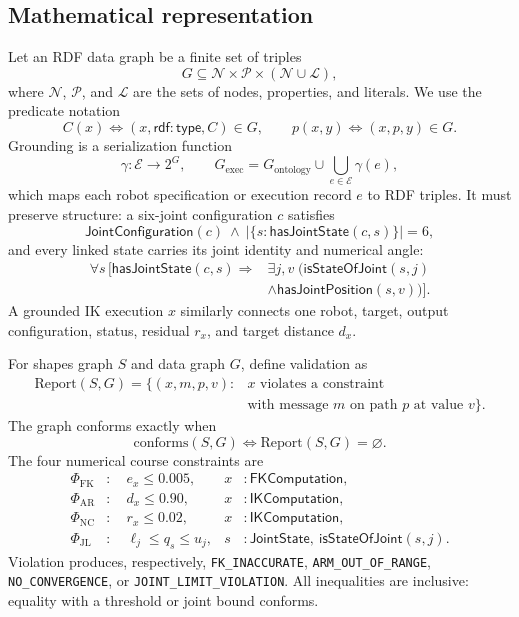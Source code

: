 \documentclass[11pt]{article}
\newcommand{\code}[1]{\nolinkurl{#1}}
\begin{document}
\subsection{Mathematical representation}

Let an RDF data graph be a finite set of triples
\[
G\subseteq \mathcal{N}\times\mathcal{P}\times(\mathcal{N}\cup\mathcal{L}),
\]
where \(\mathcal{N}\), \(\mathcal{P}\), and \(\mathcal{L}\) are the sets of
nodes, properties, and literals. We use the predicate notation
\[
C(x)\iff(x,\mathsf{rdf{:}type},C)\in G,
\qquad p(x,y)\iff(x,p,y)\in G.
\]
Grounding is a serialization function
\[
\gamma:\mathcal{E}\longrightarrow 2^{G},
\qquad
G_{\mathrm{exec}}=G_{\mathrm{ontology}}\cup
\bigcup_{e\in\mathcal{E}}\gamma(e),
\]
which maps each robot specification or execution record \(e\) to RDF triples.
It must preserve structure: a six-joint configuration \(c\) satisfies
\[
\mathsf{JointConfiguration}(c)\ \wedge\
\left|\{s:\mathsf{hasJointState}(c,s)\}\right|=6,
\]
and every linked state carries its joint identity and numerical angle:
\[
\begin{aligned}
\forall s\,[\mathsf{hasJointState}(c,s)\Rightarrow{}&
\exists j,v\;(\mathsf{isStateOfJoint}(s,j)\\
&\wedge\mathsf{hasJointPosition}(s,v))].
\end{aligned}
\]
A grounded IK execution \(x\) similarly connects one robot, target, output
configuration, status, residual \(r_x\), and target distance \(d_x\).

For shapes graph \(S\) and data graph \(G\), define validation as
\[
\begin{aligned}
\mathrm{Report}(S,G)=\{(x,m,p,v):{}&x\text{ violates a constraint}\\
&\text{with message }m\text{ on path }p\text{ at value }v\}.
\end{aligned}
\]
The graph conforms exactly when
\[
\mathrm{conforms}(S,G)\iff\mathrm{Report}(S,G)=\varnothing.
\]
The four numerical course constraints are
\begin{align*}
\Phi_{\mathrm{FK}} &: \quad e_x\leq 0.005,
&x&:\mathsf{FKComputation},\\
\Phi_{\mathrm{AR}} &: \quad d_x\leq 0.90,
&x&:\mathsf{IKComputation},\\
\Phi_{\mathrm{NC}} &: \quad r_x\leq 0.02,
&x&:\mathsf{IKComputation},\\
\Phi_{\mathrm{JL}} &: \quad \ell_j\leq q_s\leq u_j,
&s&:\mathsf{JointState},\ \mathsf{isStateOfJoint}(s,j).
\end{align*}
Violation produces, respectively, \code{FK_INACCURATE},
\code{ARM_OUT_OF_RANGE}, \code{NO_CONVERGENCE}, or
\code{JOINT_LIMIT_VIOLATION}. All inequalities are inclusive: equality with a
threshold or joint bound conforms.
\end{document}
